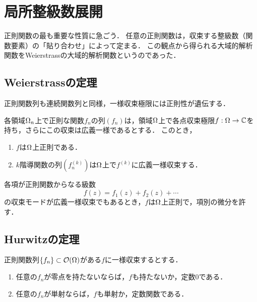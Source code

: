 \documentclass[uplatex, dvipdfmx]{jsreport}
\begin{document}
\section{局所整級数展開}

\begin{tcolorbox}[colframe=ForestGreen, colback=ForestGreen!10!white,breakable,colbacktitle=ForestGreen!40!white,coltitle=black,fonttitle=\bfseries\sffamily,
title=]
    正則関数の最も重要な性質に急ごう．
    任意の正則関数は，収束する整級数（関数要素）の「貼り合わせ」によって定まる．
    この観点から得られる大域的解析関数をWeierstrassの大域的解析関数というのであった．
\end{tcolorbox}

\subsection{Weierstrassの定理}

\begin{tcolorbox}[colframe=ForestGreen, colback=ForestGreen!10!white,breakable,colbacktitle=ForestGreen!40!white,coltitle=black,fonttitle=\bfseries\sffamily,
title=]
    正則関数列も連続関数列と同様，一様収束極限には正則性が遺伝する．
\end{tcolorbox}

\begin{theorem}[Weierstrass]\label{thm-Weierstrass-convergence-theorem}
    各領域$\Omega_n$上で正則な関数$f_n$の列$(f_n)$は，領域$\Omega$上で各点収束極限$f:\Omega\to\mathbb{C}$を持ち，さらにこの収束は広義一様であるとする．
    このとき，
    \begin{enumerate}
        \item $f$は$\Omega$上正則である．
        \item $k$階導関数の列$(f_n^{(k)})$は$\Omega$上で$f^{(k)}$に広義一様収束する．
    \end{enumerate}
\end{theorem}

\begin{corollary}
    各項が正則関数からなる級数
    \[f(z)=f_1(z)+f_2(z)+\cdots\]
    の収束モードが広義一様収束でもあるとき，$f$は$\Omega$上正則で，項別の微分を許す．
\end{corollary}

\subsection{Hurwitzの定理}

\begin{theorem}[Hurwitz]
    正則関数列$\{f_n\}\subset\mathcal{O}(\Omega)$がある$f$に一様収束するとする．
    \begin{enumerate}
        \item 任意の$f_n$が零点を持たないならば，$f$も持たないか，定数$0$である．
        \item 任意の$f_n$が単射ならば，$f$も単射か，定数関数である．
    \end{enumerate}
\end{theorem}
\end{document}
